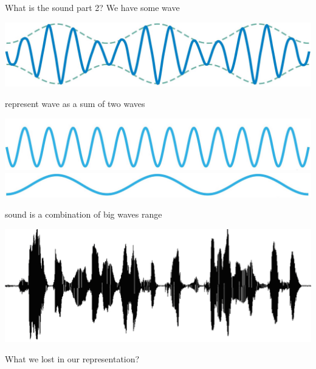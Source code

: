 \documentclass{beamer}
\begin{document}
\begin{frame}{What is the sound part 2?} 
	We have some wave 
	
	\begin{center}
		   \includegraphics[scale=0.1]{img/wave1}
	\end{center}
	
	   represent wave as a sum of two waves 
	
	\begin{center}
		   \includegraphics[scale=0.1]{img/wave2}
		   \includegraphics[scale=0.1]{img/wave3}
	\end{center}
	
	   sound is a combination of big waves range
	
	\begin{center}
		   \includegraphics[scale=0.4]{img/sound_}
	\end{center}
	
	\begin{center}
		   What we lost in our representation?
	\end{center}	
\end{frame}
\end{document}
